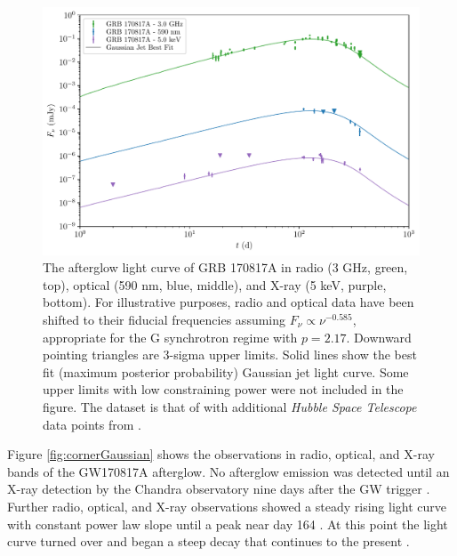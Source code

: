 \documentclass[twocolumn]{aastex62}
\newcommand{\gwbns}{GW170817A}
\newcommand{\grbbns}{GRB 170817A}
\newcommand{\hubble}{{\em Hubble Space Telescope}}
\begin{document}
\begin{figure}
	\includegraphics[width=\textwidth]{figs/lc_170817A_Gaussian_map.pdf}
	\caption{The afterglow light curve of \grbbns{} in radio (3 GHz, green, top), optical (590 nm, blue, middle), and X-ray (5 keV, purple, bottom).  For illustrative purposes, radio and optical data have been shifted to their fiducial frequencies assuming $F_\nu \propto \nu^{-0.585}$, appropriate for the G synchrotron regime with $p=2.17$. Downward pointing triangles are 3-sigma upper limits.  Solid lines show the best fit (maximum posterior probability) Gaussian jet light curve.  Some upper limits with low constraining power were not included in the figure.  The dataset is that of \citet{Troja:2019ab} with additional \hubble{} data points from \citet{Lamb:2019aa}.  \label{fig:lc170817A}}
\end{figure}

Figure \ref{fig:cornerGaussian} shows the observations in radio, optical, and X-ray bands of the \gwbns{} afterglow.  No afterglow emission was detected until an X-ray detection by the Chandra observatory nine days after the GW trigger \cite{Troja:2017aa}.  Further radio, optical, and X-ray observations showed a steady rising light curve with constant power law slope until a peak near day 164 \citep{Haggard:2017aa, Hallinan:2017aa, DAvanzo:2018aa,  Lyman:2018aa, Margutti:2018aa, Mooley:2018aa, Troja:2018aa, Troja:2019ab}.  At this point the light curve turned over and began a steep decay that continues to the present \citep{Alexander:2018aa, Fong:2019aa, Lamb:2019aa, Mooley:2018ac, Troja:2019ab}.
\end{document}
